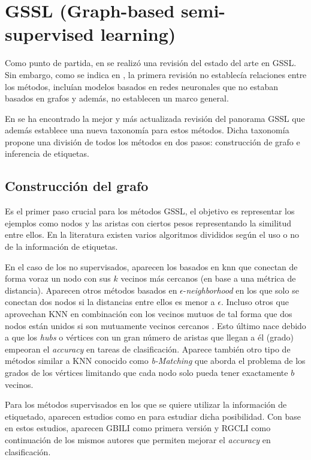 \section{GSSL (Graph-based semi-supervised learning)}

Como punto de partida, en \cite{chong2020graph} se realizó una revisión del estado del arte en GSSL. Sin embargo, como se indica en \cite{song2022graph}, la primera revisión no establecía relaciones entre los métodos, incluían modelos basados en redes neuronales que no estaban basados en grafos y además, no establecen un marco general.

En \cite{song2022graph} se ha encontrado la mejor y más actualizada revisión del panorama GSSL que además establece una nueva taxonomía para estos métodos. Dicha taxonomía propone una división de todos los métodos en dos pasos: construcción de grafo e inferencia de etiquetas.

\subsection{Construcción del grafo}

Es el primer paso crucial para los métodos GSSL, el objetivo es representar los ejemplos como nodos y las aristas con ciertos pesos representando la similitud entre ellos. En la literatura existen varios algoritmos divididos según el uso o no de la información de etiquetas. 

En el caso de los no supervisados, aparecen los basados en \Gls{knn} que conectan de forma voraz un nodo con sus $k$ vecinos más cercanos (en base a una métrica de distancia). Aparecen otros métodos basados en $\epsilon$-\textit{neighborhood} en los que solo se conectan dos nodos si la distancias entre ellos es menor a $\epsilon$. Incluso otros que aprovechan KNN en combinación con los vecinos mutuos de tal forma que dos nodos están unidos si son mutuamente vecinos cercanos \cite{ozaki2011using}. Esto último nace debido a que los \textit{hubs} o vértices con un gran número de aristas que llegan a él (grado) empeoran el \textit{accuracy} en tareas de clasificación. Aparece también otro tipo de métodos similar a KNN conocido como \textit{b-Matching} que aborda el problema de los grados de los vértices limitando que cada nodo solo pueda tener exactamente $b$ vecinos.

Para los métodos supervisados en los que se quiere utilizar la información de etiquetado, aparecen estudios como en \cite{dhillon2010learning} para estudiar dicha posibilidad. Con base en estos estudios, aparecen GBILI \cite{berton2014graph} como primera versión y RGCLI \cite{berton2017rgcli} como continuación de los mismos autores que permiten mejorar el \textit{accuracy} en clasificación.

